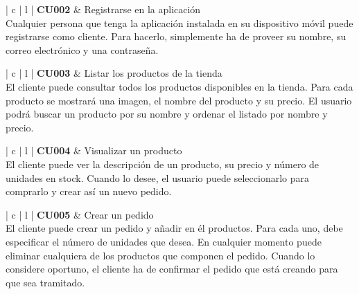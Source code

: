 \documentclass[11pt,spanish,listoffigures]{tfgetsinf}
\begin{document}
\begin{center}
\begin{tabular}{ | c | l | }
\hline
\textbf{ CU002 } & Registrarse en la aplicación \\
\hline
{}
{
Cualquier persona que tenga la aplicación instalada en su dispositivo móvil puede registrarse como cliente. Para hacerlo, simplemente ha de proveer su nombre, su correo electrónico y una contraseña.
} \\
\hline
\end{tabular}
\end{center}

\begin{center}
\begin{tabular}{ | c | l | }
\hline
\textbf{ CU003 } & Listar los productos de la tienda \\
\hline
{}
{
El cliente puede consultar todos los productos disponibles en la tienda. Para cada producto se mostrará una imagen, el nombre del producto y su precio. El usuario podrá buscar un producto por su nombre y ordenar el listado por nombre y precio.
} \\
\hline
\end{tabular}
\end{center}

\begin{center}
\begin{tabular}{ | c | l | }
\hline
\textbf{ CU004 } & Visualizar un producto \\
\hline
{}
{
El cliente puede ver la descripción de un producto, su precio y número de unidades en stock. Cuando lo desee, el usuario puede seleccionarlo para comprarlo y crear así un nuevo pedido.
} \\
\hline
\end{tabular}
\end{center}

\begin{center}
\begin{tabular}{ | c | l | }
\hline
\textbf{ CU005 } & Crear un pedido \\
\hline
{}
{
El cliente puede crear un pedido y añadir en él productos. Para cada uno, debe especificar el número de unidades que desea. En cualquier momento puede eliminar cualquiera de los productos que componen el pedido. Cuando lo considere oportuno, el cliente ha de confirmar el pedido que está creando para que sea tramitado.
} \\
\hline
\end{tabular}
\end{center}
\end{document}
